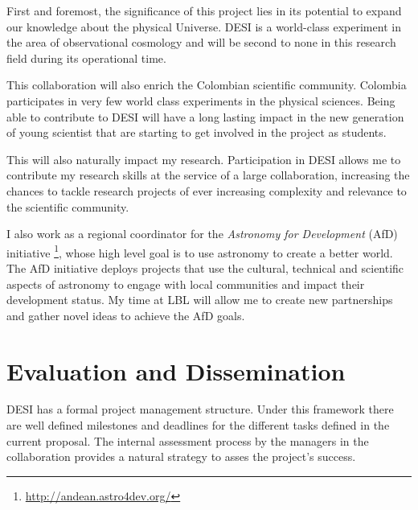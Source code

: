 \documentclass[12pt]{article}
\begin{document}
First and foremost, the significance of this project lies in its
potential to expand our knowledge about the physical Universe. DESI is
a world-class experiment in the area of observational cosmology and
will be second to none in this research field during its operational
time.  
 

This collaboration will also enrich the Colombian scientific
community. Colombia participates in very few world class experiments
in the physical sciences. Being able to contribute to DESI will have a
long lasting impact in the new generation of young scientist that are
starting to get involved in the project as students.

This will also naturally impact my research. Participation in DESI
allows me to contribute my research skills at the service of a large
collaboration, increasing the chances to tackle research projects of
ever increasing complexity and relevance to the scientific community.  



I also work as a regional coordinator for the \emph{Astronomy for
Development} (AfD)
initiative \footnote{\url{http://andean.astro4dev.org/}}, whose high
level goal is to use astronomy to create a better world.
The AfD initiative deploys projects that use the cultural, technical
and scientific aspects of astronomy to engage with local communities
and impact their development status.  My time at LBL will allow me to
create new partnerships and gather novel ideas to achieve the AfD goals.



\section*{Evaluation and Dissemination}


DESI has a formal project management structure. 
Under this framework there are well defined milestones
and deadlines for the different tasks defined in the current
proposal. The internal assessment process by the managers in the
collaboration provides a natural strategy to asses the project's success.  
\end{document}
